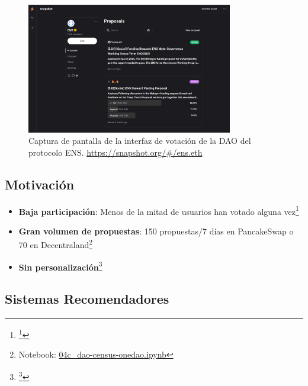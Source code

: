 \begin{frame}
    \begin{figure}
        \centering
        \includegraphics[width=9cm]{images/screenshots/Snapshot_ENS_Proposals.png}
        \caption{Captura de pantalla de la interfaz de votación de la DAO del protocolo ENS. \url{https://snapshot.org/\#/ens.eth}}
    \end{figure}
\end{frame}

\subsection{Motivación}

\begin{frame}
    \begin{itemize}[<+->]
        \item \textbf{Baja participación}: Menos de la mitad de usuarios han votado alguna vez\footnote{\footcite{arroyo_dao-analyzer_2022}}
        \item \textbf{Gran volumen de propuestas}: 150 propuestas/7 días en PancakeSwap o 70 en Decentraland\footnote{Notebook: \href{https://github.com/daviddavo/upm-tfm-notebooks/blob/main/04c_dao-census-onedao.ipynb}{04c\_dao-census-onedao.ipynb}}
        \item \textbf{Sin personalización}\footnote{\footcite{aviv_all_2023}}
    \end{itemize}
\end{frame}

\subsection{Sistemas Recomendadores}

